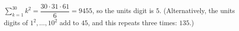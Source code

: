 $\displaystyle\sum_{k=1}^{30}k^2=\dfrac{30\cdot31\cdot61}{6}=9455$, so the units digit is $\boxed{5}$. (Alternatively, the units digits of $1^2,\dots,10^2$ add to $45$, and this repeats three times: $135$.)
